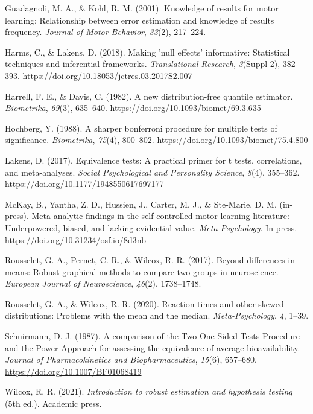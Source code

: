 \documentclass[
  doc, donotrepeattitle,floatsintext]{apa7}
\newlength{\cslhangindent}
\newlength{\cslentryspacingunit} %
\newenvironment{CSLReferences}[2] %
 {%
  \setlength{\parindent}{0pt}
  \ifodd #1
  \let\oldpar\par
  \def\par{\hangindent=\cslhangindent\oldpar}
  \fi
  \setlength{\parskip}{#2\cslentryspacingunit}
 }%
 {}
\begin{document}
\begin{CSLReferences}{1}{0}
\leavevmode{}%
Guadagnoli, M. A., \& Kohl, R. M. (2001). Knowledge of results for motor learning: Relationship between error estimation and knowledge of results frequency. \emph{Journal of Motor Behavior}, \emph{33}(2), 217--224.

\leavevmode{}%
Harms, C., \& Lakens, D. (2018). Making 'null effects' informative: Statistical techniques and inferential frameworks. \emph{Translational Research}, \emph{3}(Suppl 2), 382--393. \url{https://doi.org/10.18053/jctres.03.2017S2.007}

\leavevmode{}%
Harrell, F. E., \& Davis, C. (1982). A new distribution-free quantile estimator. \emph{Biometrika}, \emph{69}(3), 635--640. \url{https://doi.org/10.1093/biomet/69.3.635}

\leavevmode{}%
Hochberg, Y. (1988). A sharper bonferroni procedure for multiple tests of significance. \emph{Biometrika}, \emph{75}(4), 800--802. \url{https://doi.org/10.1093/biomet/75.4.800}

\leavevmode{}%
Lakens, D. (2017). Equivalence tests: {A} practical primer for t tests, correlations, and meta-analyses. \emph{Social Psychological and Personality Science}, \emph{8}(4), 355--362. \url{https://doi.org/10.1177/1948550617697177}

\leavevmode{}%
McKay, B., Yantha, Z. D., Hussien, J., Carter, M. J., \& Ste-Marie, D. M. (in-press). Meta-analytic findings in the self-controlled motor learning literature: {Underpowered}, biased, and lacking evidential value. \emph{Meta-Psychology}. In-press. \url{https://doi.org/10.31234/osf.io/8d3nb}

\leavevmode{}%
Rousselet, G. A., Pernet, C. R., \& Wilcox, R. R. (2017). Beyond differences in means: Robust graphical methods to compare two groups in neuroscience. \emph{European Journal of Neuroscience}, \emph{46}(2), 1738--1748.

\leavevmode{}%
Rousselet, G. A., \& Wilcox, R. R. (2020). Reaction times and other skewed distributions: Problems with the mean and the median. \emph{Meta-Psychology}, \emph{4}, 1--39.

\leavevmode{}%
Schuirmann, D. J. (1987). A comparison of the Two One-Sided Tests Procedure and the Power Approach for assessing the equivalence of average bioavailability. \emph{Journal of Pharmacokinetics and Biopharmaceutics}, \emph{15}(6), 657--680. \url{https://doi.org/10.1007/BF01068419}

\leavevmode{}%
Wilcox, R. R. (2021). \emph{Introduction to robust estimation and hypothesis testing} (5th ed.). Academic press.

\end{CSLReferences}
\end{document}
